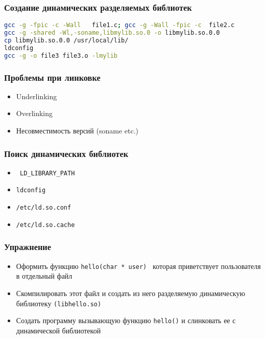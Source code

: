 \begin{frame}[fragile]
  \frametitle{Создание динамических разделяемых библиотек}
\begin{lstlisting}[language=sh]
gcc -g -fpic -c -Wall   file1.c; gcc -g -Wall -fpic -c  file2.c
gcc -g -shared -Wl,-soname,libmylib.so.0 -o libmylib.so.0.0 
cp libmylib.so.0.0 /usr/local/lib/
ldconfig 
gcc -g -o file3 file3.o -lmylib
\end{lstlisting}
\end{frame}

\begin{frame}
 \frametitle{Проблемы при линковке}
 \begin{itemize}
   \item Underlinking
   \item Overlinking
   \item Несовместимость версий (soname etc.)
 \end{itemize}
\end{frame}

\begin{frame}[fragile]
  \frametitle{Поиск динамических библиотек}
  \begin{itemize}
    \item \verb+ LD_LIBRARY_PATH +
    \item {\tt ldconfig}
    \item {\tt /etc/ld.so.conf}
    \item {\tt /etc/ld.so.cache}
  \end{itemize}
\end{frame}

\begin{frame}
  \frametitle{Упражнение}
  \begin{itemize}
    \item Оформить функцию {\tt hello(char * user) } которая приветствует пользователя в отдельный файл
    \item Скомпилировать этот файл и создать из него разделяемую динамическую библиотеку {\tt (libhello.so)}
    \item Создать программу вызывающую функцию {\tt hello()} и слинковать ее с динамической библиотекой
  \end{itemize}
\end{frame}
